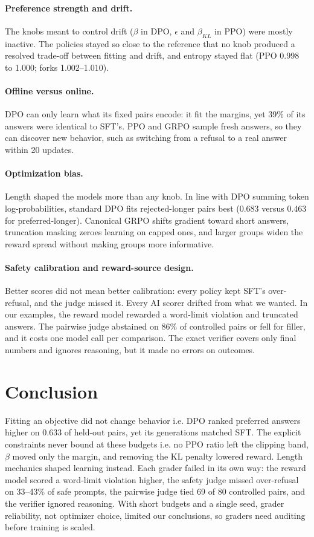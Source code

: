 \documentclass{article}
\begin{document}
\paragraph{Preference strength and drift.} The knobs meant to control drift ($\beta$ in DPO, $\epsilon$ and $\beta_{KL}$ in PPO) were mostly inactive. The policies stayed so close to the reference that no knob produced a resolved trade-off between fitting and drift, and entropy stayed flat (PPO 0.998 to 1.000; forks 1.002--1.010).

\paragraph{Offline versus online.} DPO can only learn what its fixed pairs encode: it fit the margins, yet 39\% of its answers were identical to SFT's. PPO and GRPO sample fresh answers, so they can discover new behavior, such as switching from a refusal to a real answer within 20 updates.

\paragraph{Optimization bias.} Length shaped the models more than any knob. In line with DPO summing token log-probabilities, standard DPO fits rejected-longer pairs best (0.683 versus 0.463 for preferred-longer). Canonical GRPO shifts gradient toward short answers, truncation masking zeroes learning on capped ones, and larger groups widen the reward spread without making groups more informative.

\paragraph{Safety calibration and reward-source design.} Better scores did not mean better calibration: every policy kept SFT's over-refusal, and the judge missed it. Every AI scorer drifted from what we wanted. In our examples, the reward model rewarded a word-limit violation and truncated answers. The pairwise judge abstained on 86\% of controlled pairs or fell for filler, and it costs one model call per comparison. The exact verifier covers only final numbers and ignores reasoning, but it made no errors on outcomes.

\section{Conclusion}
Fitting an objective did not change behavior i.e. DPO ranked preferred answers higher on 0.633 of held-out pairs, yet its generations matched SFT. The explicit constraints never bound at these budgets i.e. no PPO ratio left the clipping band, $\beta$ moved only the margin, and removing the KL penalty lowered reward. Length mechanics shaped learning instead. Each grader failed in its own way: the reward model scored a word-limit violation higher, the safety judge missed over-refusal on 33--43\% of safe prompts, the pairwise judge tied 69 of 80 controlled pairs, and the verifier ignored reasoning. With short budgets and a single seed, grader reliability, not optimizer choice, limited our conclusions, so graders need auditing before training is scaled.
\end{document}

